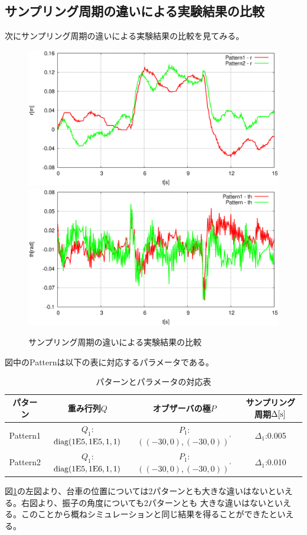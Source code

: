 	\subsection{サンプリング周期の違いによる実験結果の比較}
	次にサンプリング周期の違いによる実験結果の比較を見てみる。
	\begin{figure}[H]
		\centering
		\includegraphics[width=0.49\linewidth]{gazo/Compare_dt_R.eps}
		\includegraphics[width=0.49\linewidth]{gazo/Compare_dt_TH.eps}
		\caption{サンプリング周期の違いによる実験結果の比較}
		\label{image:comp_dt}
	\end{figure}
	図中のPatternは以下の表に対応するパラメータである。
	\begin{table}[H]
		\begin{center}
			\caption{パターンとパラメータの対応表}
			\medskip
			
			\begin{tabular}{|c|c|c|c|}\hline
				パターン & 重み行列$Q$ & オブザーバの極$P$ & サンプリング周期$\Delta[\rm{s}]$ \\ \hline\hline
				Pattern1 & $Q_1$:$\rm{diag}(1E5,1E5,1,1)$ & $P_1$:$((-30,0),(-30,0))^{'}$ & $\Delta_1$:0.005 \\ \hline
				Pattern2 & $Q_1$:$\rm{diag}(1E5,1E6,1,1)$ & $P_1$:$((-30,0),(-30,0))^{'}$ & $\Delta_1$:0.010 \\ \hline
			\end{tabular}
		\end{center}
		\label{table:huriage_control}
	\end{table}
	図\ref{image:comp_dt}の左図より、台車の位置については2パターンとも大きな違いはないといえる。右図より、振子の角度についても2パターンとも
	大きな違いはないといえる。このことから概ねシミュレーションと同じ結果を得ることができたといえる。
	\newpage
